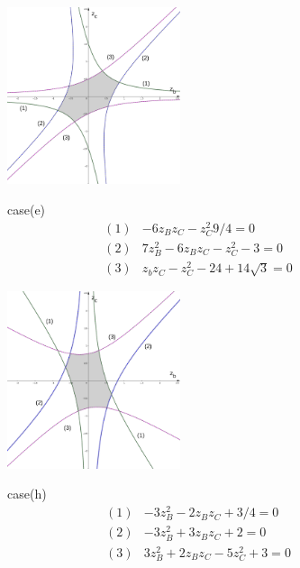 \documentclass[suppldata, dvipdfmx]{interact}
\theoremstyle{plain}%
\theoremstyle{definition}
\theoremstyle{remark}
\theoremstyle{problemstyle}
\begin{document}
\begin{figure}[h!tbp]
 \begin{minipage}[]{0.5\textwidth}
 \centering
 \includegraphics[width=2in,
 keepaspectratio]{./img/graph/cubeE.png}
 \caption{}
 \label{fig:graphCubeE}
 \end{minipage}
 \hspace*{\fill}
 \begin{minipage}[]{0.5\textwidth}
  \centering
  case(e)
  \begin{align*}
   (1)& -6z_Bz_C - z_C^2 9/4 = 0\\
   (2)& 7z_B^2 - 6z_Bz_C - z_C^2 - 3 = 0\\
   (3)& z_bz_C - z_C^2 - 24 + 14\sqrt{3} = 0
  \end{align*}
 \end{minipage}
 \hspace*{\fill}
\end{figure}

\begin{figure}[h!tbp]
 \begin{minipage}[]{0.5\textwidth}
 \centering
 \includegraphics[width=2in,
 keepaspectratio]{./img/graph/cubeH.png}
 \caption{}
 \label{fig:graphCubeH}
 \end{minipage}
 \hspace*{\fill}
 \begin{minipage}[]{0.5\textwidth}
  \centering
  case(h)
  \begin{align*}
   (1)& -3z_B^2 - 2z_Bz_C + 3/4 = 0\\
   (2)& -3z_B^2 + 3 z_Bz_C + 2 = 0\\
   (3)&  3z_B^2 + 2z_Bz_C -5z_C^2 + 3 = 0
  \end{align*}
 \end{minipage}
 \hspace*{\fill}
\end{figure}
\end{document}
